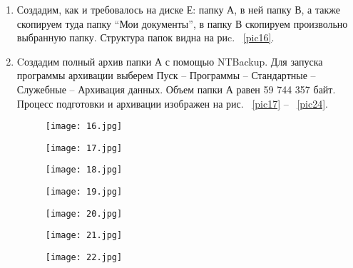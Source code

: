 \begin{enumerate}

\item
  Создадим, как и требовалось на диске Е: папку А, в ней папку В, а также скопируем туда папку ``Мои документы'', в папку В скопируем произвольно выбранную папку. Структура папок видна на риc. ~\ref{pic16}.
\item
  Cоздадим полный архив папки А с помощью NTBackup. Для запуска программы архивации выберем Пуск -- Программы -- Стандартные -- Служебные -- Архивация данных. Объем папки А равен 59 744 357 байт. Процесс подготовки и архивации изображен на рис. ~\ref{pic17} -- ~\ref{pic24}.

\begin{figure}[h!t] 
  \begin{center}

  \begin{minipage}[h]{0.4\linewidth}

  \texttt{[image: 16.jpg]}
  \caption{\label{pic16}}

  \bigskip
  
  \texttt{[image: 17.jpg]}
  \caption{\label{pic17}}

  \bigskip
    
  \texttt{[image: 18.jpg]}
  \caption{\label{pic18}}

  \bigskip
  
  \texttt{[image: 19.jpg]}
  \caption{\label{pic19}}
  
  \end{minipage}
  \hfill   
  \begin{minipage}[h]{0.4\linewidth}

  \texttt{[image: 20.jpg]}
  \caption{\label{pic20}}

  \bigskip
      
  \texttt{[image: 21.jpg]}
  \caption{\label{pic21}}

  \bigskip
  
  \texttt{[image: 22.jpg]}
  \caption{\label{pic22}}

  \end{minipage}          
  \end{center}
\end{figure}

\begin{figure}[h!t] 
  \begin{center}
  \begin{minipage}[h]{0.4\linewidth}
  

\end{minipage}
\end{center}
\end{figure}
\end{enumerate}
